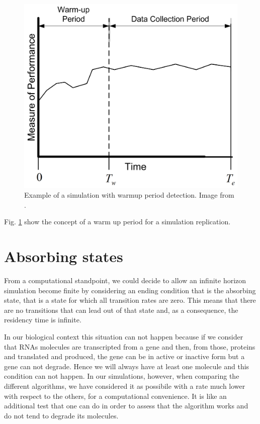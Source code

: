 \documentclass[12pt,a4paper]{report}
\begin{document}
\begin{figure}[!ht]
\centering
\includegraphics[scale=0.90]{figWarmUpPeriod.png}
\caption{Example of a simulation with warmup period detection. Image from \cite{Manuel}.}
\label{figWarmUpPeriod}
\end{figure}

Fig. \ref{figWarmUpPeriod} show the concept of a warm up period for a simulation replication.
\newpage
\section{Absorbing states}\label{absorbingstate}
From a computational standpoint, we could decide to allow an infinite horizon simulation become finite by considering an ending condition that is the absorbing state, that is a state for which all transition rates are zero. This means that there are no transitions that can lead out of that state and, as a consequence, the residency time is infinite.

In our biological context this situation can not happen because if we consider that RNAs molecules are transcripted from a gene and then, from those, proteins and translated and produced, the gene can be in active or inactive form but a gene can not degrade. Hence we will always have at least one molecule and this condition can not happen. In our simulations, however, when comparing the different algorithms, we have considered it as possibile with a rate much lower with respect to the others, for a computational convenience. It is like an additional test that one can do in order to assess that the algorithm works and do not tend to degrade its molecules. 
\end{document}
